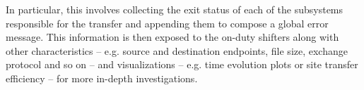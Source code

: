 In particular, this involves collecting the exit status of each of the subsystems responsible for the transfer and appending them to compose a global error message.
This information is then exposed to the on-duty shifters along with other characteristics -- e.g. source and destination endpoints, file size, exchange protocol and so on -- and visualizations -- e.g. time evolution plots or site transfer efficiency -- for more in-depth investigations.

